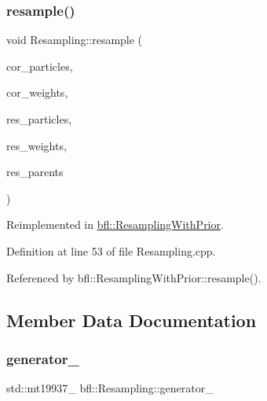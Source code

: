 \mbox{\label{classbfl_1_1Resampling_a6b5a246250f1d193b3316c10bdc689f6}} 
\subsubsection{\texorpdfstring{resample()}{resample()}}
{\footnotesize\ttfamily void Resampling\+::resample (\begin{DoxyParamCaption}\item[{const Eigen\+::\+Ref$<$ const Eigen\+::\+Matrix\+Xf $>$ \&}]{cor\+\_\+particles,  }\item[{const Eigen\+::\+Ref$<$ const Eigen\+::\+Vector\+Xf $>$ \&}]{cor\+\_\+weights,  }\item[{Eigen\+::\+Ref$<$ Eigen\+::\+Matrix\+Xf $>$}]{res\+\_\+particles,  }\item[{Eigen\+::\+Ref$<$ Eigen\+::\+Vector\+Xf $>$}]{res\+\_\+weights,  }\item[{Eigen\+::\+Ref$<$ Eigen\+::\+Vector\+Xf $>$}]{res\+\_\+parents }\end{DoxyParamCaption})\hspace{0.3cm}{\ttfamily [virtual]}}



Reimplemented in \mbox{\hyperlink{classbfl_1_1ResamplingWithPrior_a440090305ac024e1f5ad06fd36cccd34}{bfl\+::\+Resampling\+With\+Prior}}.



Definition at line 53 of file Resampling.\+cpp.



Referenced by bfl\+::\+Resampling\+With\+Prior\+::resample().



\subsection{Member Data Documentation}
\mbox{\label{classbfl_1_1Resampling_abfffdeeb6fc82608a4ff2fdae3c707f0}} 
\subsubsection{\texorpdfstring{generator\+\_\+}{generator\_}}
{\footnotesize\ttfamily std\+::mt19937\+\_ bfl\+::\+Resampling\+::generator\+\_\+\hspace{0.3cm}{\ttfamily [private]}}



